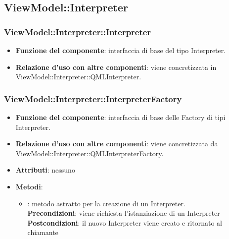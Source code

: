 \subsection{ViewModel::Interpreter}
\subsubsection{ViewModel::Interpreter::Interpreter}
\begin{itemize}
\item\textbf{Funzione del componente}: interfaccia di base del tipo Interpreter.
	\item\textbf{Relazione d'uso con altre componenti}: viene concretizzata in ViewModel::Interpreter::QMLInterpreter.\\
\end{itemize}
\subsubsection{ViewModel::Interpreter::InterpreterFactory}
\begin{itemize}
\item\textbf{Funzione del componente}: interfaccia di base delle Factory di tipi Interpreter.
	\item\textbf{Relazione d'uso con altre componenti}: viene concretizzata da\\ ViewModel::Interpreter::QMLInterpreterFactory.\\ 
\item\textbf{Attributi}: nessuno
\item\textbf{Metodi}:
	\begin{itemize}
		\item{}: metodo astratto per la creazione di un Interpreter.\\
		\textbf{Precondizioni}: viene richiesta l'istanziazione di un Interpreter\\
		\textbf{Postcondizioni}: il nuovo Interpreter viene creato e ritornato al chiamante\\
	\end{itemize}
\end{itemize}

